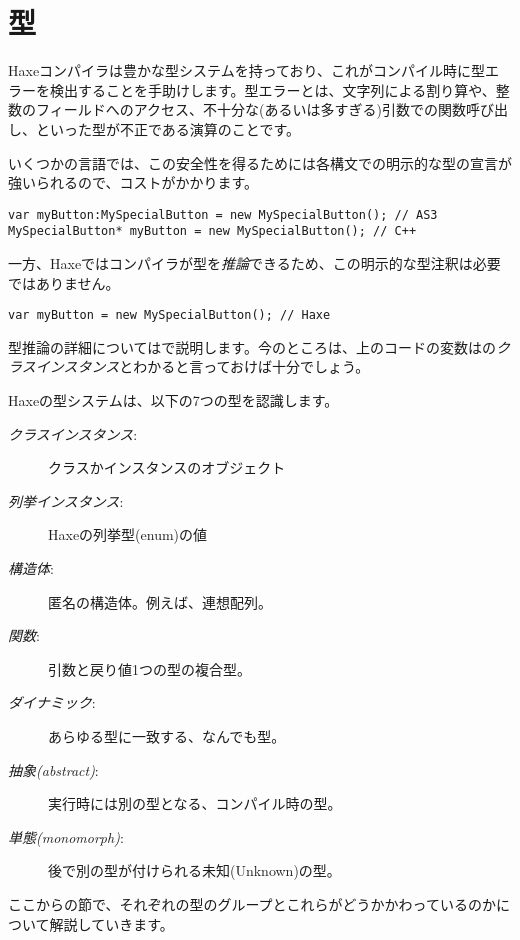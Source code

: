 \chapter{型}
\label{types}

Haxeコンパイラは豊かな型システムを持っており、これがコンパイル時に型エラーを検出することを手助けします。型エラーとは、文字列による割り算や、整数のフィールドへのアクセス、不十分な(あるいは多すぎる)引数での関数呼び出し、といった型が不正である演算のことです。

いくつかの言語では、この安全性を得るためには各構文での明示的な型の宣言が強いられるので、コストがかかります。

\begin{lstlisting}
var myButton:MySpecialButton = new MySpecialButton(); // AS3
MySpecialButton* myButton = new MySpecialButton(); // C++ 
\end{lstlisting}

一方、Haxeではコンパイラが型を\emph{推論}できるため、この明示的な型注釈は必要ではありません。

\begin{lstlisting}
var myButton = new MySpecialButton(); // Haxe
\end{lstlisting}

型推論の詳細についてはで説明します。今のところは、上のコードの変数はの\emph{クラスインスタンス}とわかると言っておけば十分でしょう。

Haxeの型システムは、以下の7つの型を認識します。

\begin{description}
 \item[\emph{クラスインスタンス}:] クラスかインスタンスのオブジェクト
 \item[\emph{列挙インスタンス}:] Haxeの列挙型(enum)の値
 \item[\emph{構造体}:] 匿名の構造体。例えば、連想配列。
 \item[\emph{関数}:] 引数と戻り値1つの型の複合型。
 \item[\emph{ダイナミック}:] あらゆる型に一致する、なんでも型。
 \item[\emph{抽象(abstract)}:] 実行時には別の型となる、コンパイル時の型。
 \item[\emph{単態(monomorph)}:] 後で別の型が付けられる未知(Unknown)の型。
\end{description}

ここからの節で、それぞれの型のグループとこれらがどうかかわっているのかについて解説していきます。

